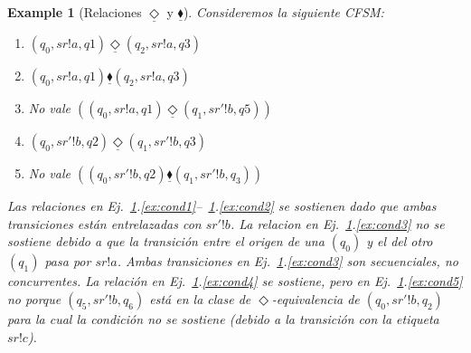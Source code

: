 \documentclass[paper=a4, fontsize=11pt, spanish]{scrartcl} %
\numberwithin{equation}{section} %
\numberwithin{figure}{section} %
\numberwithin{table}{section} %
\newtheorem{example}{Example}
\begin{document}
\begin{example}[Relaciones $\underline{\Diamond}$ y $\underline{\blacklozenge}$]
\label{ex:relaciones}
Consideremos la siguiente CFSM:
\begin{center}
\end{center}

\begin{enumerate}
    \item \label{ex:cond1} $(q_0, sr!a,q1) \underline{\Diamond} (q_2,sr!a,q3)  $ %
    \item \label{ex:cond2} $(q_0, sr!a,q1) \underline{\blacklozenge} (q_2,sr!a,q3) $ %
    \item \label{ex:cond3} No vale $ ((q_0, sr!a,q1) \underline{\Diamond} (q_1,sr'!b,q5))$ %
    \item \label{ex:cond4} $ (q_0, sr'!b,q2) \underline{\Diamond} (q_1, sr'!b,q3)$ %
    \item \label{ex:cond5} No vale $((q_0, sr'!b,q2) \underline{\blacklozenge} (q_1,sr'!b,q_3)) $
\end{enumerate}

Las relaciones en Ej.~\ref{ex:relaciones}.\ref{ex:cond1}--~\ref{ex:relaciones}.\ref{ex:cond2} se sostienen dado que ambas transiciones están entrelazadas con $sr'!b$. La relacion en Ej.~\ref{ex:relaciones}.\ref{ex:cond3} no se sostiene debido a que la transición entre el origen de una $(q_0)$ y el del otro $(q_1)$ pasa por $sr!a$. Ambas transiciones en Ej.~\ref{ex:relaciones}.\ref{ex:cond3} son secuenciales, no concurrentes. La relación en Ej.~\ref{ex:relaciones}.\ref{ex:cond4} se sostiene, pero en Ej.~\ref{ex:relaciones}.\ref{ex:cond5} no porque $(q_5,sr'!b,q_6)$ está en la clase de $\Diamond$-equivalencia de $(q_0,sr'!b,q_2)$ para la cual la condición no se sostiene (debido a la transición con la etiqueta $sr!c$).
\end{example}
\end{document}
